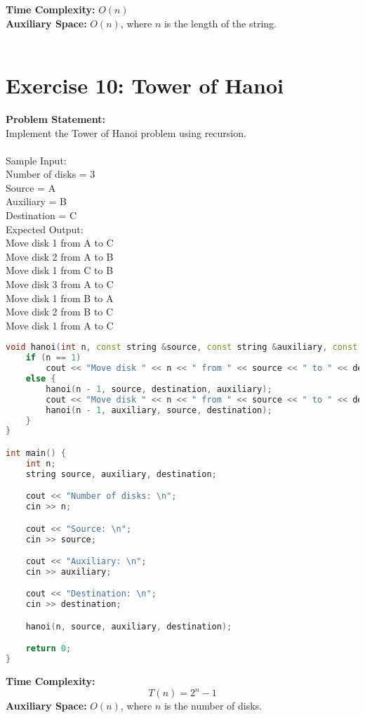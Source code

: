\documentclass{article}
\begin{document}
\textbf{Time Complexity:} $O(n)$\\
\textbf{Auxiliary Space:} $O(n)$, where $n$ is the length of the string.\\\\

\newpage
\section{Exercise 10: Tower of Hanoi}
\textbf{Problem Statement:}\\
Implement the Tower of Hanoi problem using recursion.\\\\
Sample Input:\\
Number of disks = 3\\
Source = A\\
Auxiliary = B\\
Destination = C\\
Expected Output:\\
Move disk 1 from A to C\\
Move disk 2 from A to B\\
Move disk 1 from C to B\\
Move disk 3 from A to C\\
Move disk 1 from B to A\\
Move disk 2 from B to C\\
Move disk 1 from A to C

\begin{lstlisting}[language=C++, caption={Tower of Hanoi Procedure}, label=cppcode]
void hanoi(int n, const string &source, const string &auxiliary, const string &destination) {
    if (n == 1)
        cout << "Move disk " << n << " from " << source << " to " << destination << '\n';
    else {
        hanoi(n - 1, source, destination, auxiliary);
        cout << "Move disk " << n << " from " << source << " to " << destination << '\n';
        hanoi(n - 1, auxiliary, source, destination);
    }
}

int main() {
    int n;
    string source, auxiliary, destination;

    cout << "Number of disks: \n";
    cin >> n;

    cout << "Source: \n";
    cin >> source;

    cout << "Auxiliary: \n";
    cin >> auxiliary;

    cout << "Destination: \n";
    cin >> destination;

    hanoi(n, source, auxiliary, destination);

    return 0;
}
\end{lstlisting}
\textbf{Time Complexity:}
\[
T(n) = 2^{n} - 1
\]
\textbf{Auxiliary Space:} $O(n)$, where $n$ is the number of disks.\\\\
\end{document}
